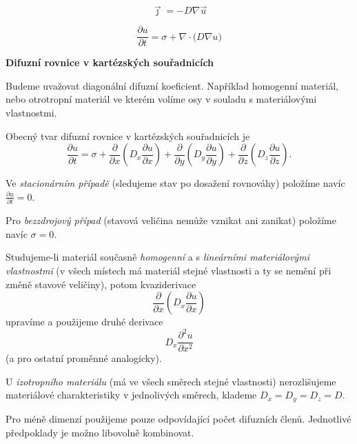 \documentclass{article}
\begin{document}
\begin{multicols}{3}
$$\vec \jmath=-D\nabla \vec u$$

$${\frac{\partial u}{\partial t}=\sigma + \nabla\cdot \bigl(D\nabla u\bigr)}$$


\vfill
\columnbreak

\textbf{Difuzní rovnice v kartézských souřadnicích}


Budeme uvažovat diagonální difuzní koeficient. Například homogenní materiál, nebo otrotropní materiál ve kterém volíme osy v souladu s materiálovými vlastnostmi.

Obecný tvar difuzní rovnice v kartézských souřadnicích je
$$\frac{\partial u}{\partial t}=\sigma +
\frac{\partial }{\partial x}\left(D_x \frac{\partial u}{\partial x}\right)
+
\frac{\partial }{\partial y}\left(D_y \frac{\partial u}{\partial y}\right)
+
\frac{\partial }{\partial z}\left(D_z \frac{\partial u}{\partial z}\right).
$$

Ve \textit{stacionárním případě} (sledujeme stav po dosažení rovnováhy) položíme navíc $\frac{\partial u}{\partial t}=0$.

Pro \textit{bezzdrojový případ} (stavová veličina nemůže vznikat ani zanikat) položíme navíc $\sigma=0$.

Studujeme-li materiál současně \textit{homogenní} a s \textit{lineárními materiálovými vlastnostmi} (v všech místech má materiál stejné vlastnosti a ty se nemění při změně stavové veličiny), potom kvaziderivace
$$\frac{\partial }{\partial x}\left(D_x \frac{\partial u}{\partial x}\right)$$
upravíme a použijeme druhé derivace
$$D_x \frac{\partial^2 u}{\partial x^2}$$ (a pro ostatní proměnné analogicky).

U \textit{izotropního materiálu} (má ve všech směrech stejné vlastnosti) nerozlišujeme materiálové charakteristiky v jednolivých směrech, klademe $D_x=D_y=D_z=D.$

Pro méně dimenzí  použijeme pouze odpovídající počet difuzních členů. Jednotlivé předpoklady je možno libovolně kombinovat.


\end{multicols}
\end{document}
